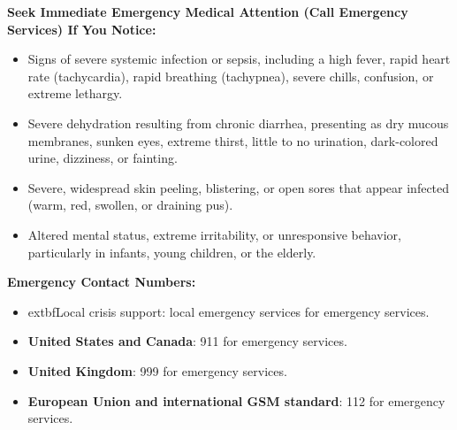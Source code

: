 \textbf{Seek Immediate Emergency Medical Attention (Call Emergency Services) If You Notice:}
\begin{itemize}
    \item Signs of severe systemic infection or sepsis, including a high fever, rapid heart rate (tachycardia), rapid breathing (tachypnea), severe chills, confusion, or extreme lethargy.
    \item Severe dehydration resulting from chronic diarrhea, presenting as dry mucous membranes, sunken eyes, extreme thirst, little to no urination, dark-colored urine, dizziness, or fainting.
    \item Severe, widespread skin peeling, blistering, or open sores that appear infected (warm, red, swollen, or draining pus).
    \item Altered mental status, extreme irritability, or unresponsive behavior, particularly in infants, young children, or the elderly.
\end{itemize}

\textbf{Emergency Contact Numbers:}
\begin{itemize}
    \item 	extbf{Local crisis support}: local emergency services for emergency services.
    \item \textbf{United States and Canada}: 911 for emergency services.
    \item \textbf{United Kingdom}: 999 for emergency services.
    \item \textbf{European Union and international GSM standard}: 112 for emergency services.
\end{itemize}

